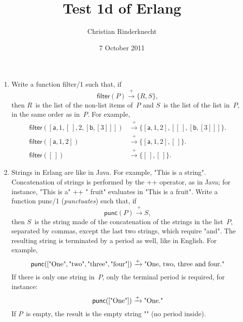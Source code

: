 \documentclass[11pt,a4paper]{article}
\title{Test 1d of \textsf{Erlang}}
\author{Christian Rinderknecht}
\date{7 October 2011}
\newcommand\fun[1]{\textsf{#1}}
\begin{document}
\maketitle

\thispagestyle{empty}

\begin{enumerate}

  \item Write a function \fun{filter/1} such that, if
    \[\fun{filter}(P) \xrightarrow{+} \{R,S\},\]
    then \(R\)~is the list of the non-list items of~\(P\) and \(S\)~is
    the list of the list in~\(P\), in the same order as in~\(P\). For
    example,
    \begin{align*}
      \fun{filter}([\fun{a},1,[\,],2,[\fun{b},[3]]])
    &\xrightarrow{+} \{[\fun{a},1,2],[[\,],[\fun{b},[3]]]\}.\\
      \fun{filter}([\fun{a},1,2])
    &\xrightarrow{+} \{[\fun{a},1,2],[\,]\}.\\
      \fun{filter}([\,])
    &\xrightarrow{+} \{[\,],[\,]\}.
    \end{align*}
    
  \item Strings in \textsf{Erlang} are like in \textsf{Java}. For
    example, \fun{"This is a string"}. Concatenation of strings is
    performed by the \fun{++} operator, as in \textsf{Java}; for
    instance, \fun{"This is a" ++ " fruit"} evaluates in \fun{"This is
      a fruit"}. Write a function \fun{punc/1} (\emph{punctuates})
    such that, if
    \[\fun{punc}(P) \xrightarrow{+} S,\]
    then \(S\)~is the string made of the concatenation of the strings
    in the list~\(P\), separated by commas, except the last two
    strings, which require "and". The resulting string is terminated
    by a period as well, like in English. For example,
    \[
    \fun{punc}([\textnormal{"One"}, \textnormal{"two"},
      \textnormal{"three"}, \textnormal{"four"}]) \xrightarrow{+}
    \textnormal{"One, two, three and four."}\] If there is only one
    string in~\(P\), only the terminal period is required, for
    instance:
    \[\fun{punc}([\textnormal{"One"}]) \xrightarrow{+} \textnormal{"One."}\] If \(P\)~is empty,
    the result is the empty string \fun{""} (no period inside).

\end{enumerate}
\end{document}
